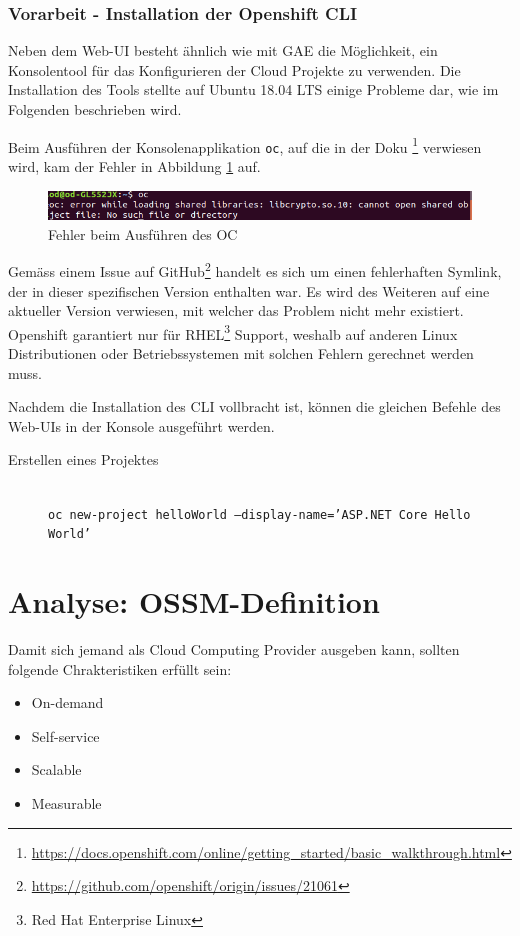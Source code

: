 \documentclass[12pt,a4paper]{article}
\begin{document}
\subsubsection{Vorarbeit - Installation der Openshift CLI}
Neben dem Web-UI besteht ähnlich wie mit GAE die Möglichkeit, ein Konsolentool für das Konfigurieren der Cloud Projekte zu verwenden. Die Installation des Tools stellte auf Ubuntu 18.04 LTS einige Probleme dar, wie im Folgenden beschrieben wird. 

Beim Ausführen der Konsolenapplikation \texttt{oc}, auf die in der Doku \footnote{\url{https://docs.openshift.com/online/getting_started/basic_walkthrough.html}} verwiesen wird, kam der Fehler in Abbildung \ref{fig:oc-error} auf.

\begin{figure}[h]
	\centering
	\includegraphics[width=1\linewidth]{img/oc-error}
	\caption{Fehler beim Ausführen des OC}
	\label{fig:oc-error}
\end{figure}
Gemäss einem Issue auf GitHub\footnote{\url{https://github.com/openshift/origin/issues/21061}} handelt es sich um einen fehlerhaften Symlink, der in dieser spezifischen Version enthalten war. Es wird des Weiteren auf eine aktueller Version verwiesen, mit welcher das Problem nicht mehr existiert. Openshift garantiert nur für RHEL\footnote{Red Hat Enterprise Linux} Support, weshalb auf anderen Linux Distributionen oder Betriebssystemen mit solchen Fehlern gerechnet werden muss.

Nachdem die Installation des CLI vollbracht ist, können die gleichen Befehle des Web-UIs in der Konsole ausgeführt werden. 
\begin{description}
	\item[Erstellen eines Projektes] \hfill\\
	\texttt{oc new-project helloWorld --display-name='ASP.NET Core Hello World'}
\end{description}
\section{Analyse: OSSM-Definition}

Damit sich jemand als Cloud Computing Provider ausgeben kann, sollten folgende Chrakteristiken erfüllt sein:

\begin{itemize}
	\item On-demand
	\item Self-service
	\item Scalable
	\item Measurable
\end{itemize}
\end{document}
